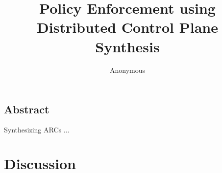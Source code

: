 \documentclass{hotnets16}
\begin{document}
 {}
\date{}


\title{Policy Enforcement using \\ Distributed Control Plane Synthesis}

\author{Anonymous}

\maketitle


\subsection*{Abstract}

Synthesizing ARCs ...










\section{Discussion}



 
\begin{small}

\end{small}
\label{last-page}
\end{document}
